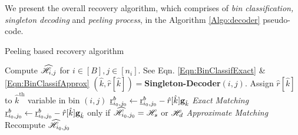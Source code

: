 \begin{enumerate}
We present the overall recovery algorithm, which comprises of {\it bin classification, singleton decoding} and {\it peeling process}, in the Algorithm \ref{Algo:decoder} pseudo-code.

\def\gap{4pt}
\begin{algorithm}[h!]
\caption{Peeling based recovery algorithm}
\label{Algo:decoder}
\begin{algorithmic}
\State Compute $\widehat{\mathscr{H}}_{i,j}$ for $i\in[B], j\in[n_i]$. See Eqn. \eqref{Eqn:BinClassifExact} \& \eqref{Eqn:BinClassifApprox}
\vspace{\gap}
\vspace{\gap}
  \State $(\hat{k},\hat{r}[\hat{k}])=${\bf Singleton-Decoder}$(i,j)$.%
\vspace{\gap}
  \State Assign $\hat{r}[\hat{k}]$ to $\hat{k}^{\text{th}}$ variable in bin $(i,j)$
\vspace{\gap}
\vspace{\gap}
	   \State $\underline{\mathrm{r}}^{b}_{i_0,j_0}\gets\underline{\mathrm{r}}^{b}_{i_0,j_0}-\hat{r}[\hat{k}]\mathbf{g}_{\hat{k}}$   \hspace{45.5ex} {\it Exact Matching}
	   \vspace{\gap}
	   \State $\underline{\mathrm{r}}^{b}_{i_0,j_0}\gets\underline{\mathrm{r}}^{b}_{i_0,j_0}-\hat{r}[\hat{k}]\mathbf{g}_{\hat{k}}$   \hspace{10ex} only if $\widehat{\mathscr{H}}_{i_0,j_0}=\mathscr{H}_s$ or $\mathscr{H}_d$ \hspace{10ex} {\it Approximate Matching}
	   \vspace{\gap}
	   \State Recompute $\widehat{\mathscr{H}}_{i_0,j_0}$
      \EndFor
\EndWhile
\end{algorithmic}
\end{algorithm}


\end{enumerate}
